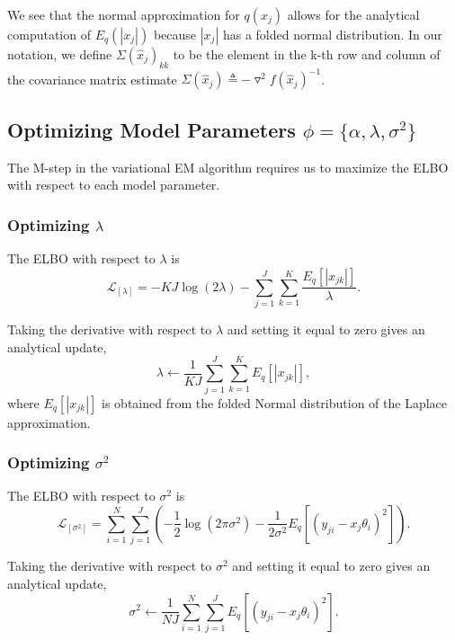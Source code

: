 \documentclass[11pt]{amsart}
\begin{document}
We see that the normal approximation for $q(x_j)$ allows for the analytical computation of $E_q(|x_j|)$ because $|x_j|$ has a folded normal distribution. In our notation, we define $\Sigma(\hat{x}_j)_{kk}$ to be the element in the k-th row and column of the covariance matrix estimate $\Sigma(\hat{x}_j)  \triangleq -\triangledown^2 f( \hat{x}_j )^{-1}$.

\subsection{Optimizing Model Parameters $\phi=\{\alpha, \lambda, \sigma^2\}$}

The M-step in the variational EM algorithm requires us to maximize the ELBO with respect to each model parameter.

\subsubsection{Optimizing $\lambda$} The ELBO with respect to $\lambda$ is
\begin{equation}
\mathcal{L}_{[\lambda]} = - K J \log(2 \lambda) -  \sum_{j=1}^J \sum_{k=1}^K \frac{ E_q[ | x_{jk} | ] }{ \lambda }.
\end{equation}

Taking the derivative with respect to $\lambda$ and setting it equal to zero gives an analytical update,
\begin{equation}
	\lambda \leftarrow  \frac{1}{KJ} \sum_{j=1}^J \sum_{k=1}^K E_q[ | x_{jk} | ],
\end{equation}
where $E_q[ | x_{jk} | ]$ is obtained from the folded Normal distribution of the Laplace approximation.

\subsubsection{Optimizing $\sigma^2$} The ELBO with respect to $\sigma^2$ is
\begin{equation}
\mathcal{L}_{[\sigma^2]} = \sum_{i=1}^N \sum_{j=1}^J \left( -\frac{1}{2} \log (2 \pi \sigma^2 ) - \frac{1}{2 \sigma^2} E_q \left[ (y_{ji} - x_j \theta_i)^2 \right] \right).
\end{equation}

Taking the derivative with respect to $\sigma^2$ and setting it equal to zero gives an analytical update,
\begin{equation}
		\sigma^2 \leftarrow  \frac{1}{NJ} \sum_{i=1}^N \sum_{j=1}^J  E_q \left[ (y_{ji} - x_j \theta_i)^2 \right].
\end{equation}
\end{document}
